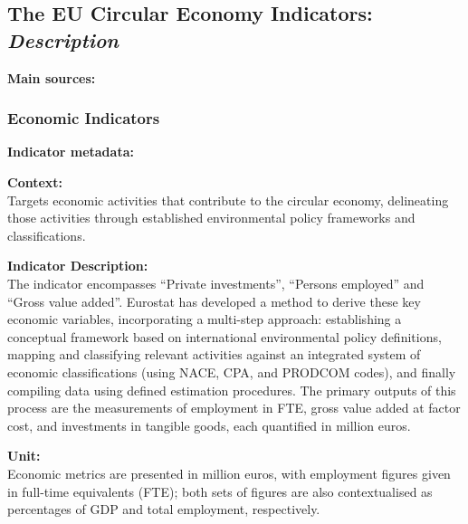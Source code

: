 
\subsection{The EU Circular Economy Indicators: \textit{Description}}

\textbf{Main sources:}~\cite{eu2018cemonitoring,eurostat2023data,eu2023cemonitoring}



\subsubsection{Economic Indicators}

\textbf{Indicator metadata:}   \href{https://ec.europa.eu/eurostat/cache/metadata/en/cei_cie011_esmsip2.htm}{\faExternalLink}

{\large\textbf{Context:}}  \\ \indent
Targets economic activities that contribute to the circular economy, delineating those activities through established environmental policy frameworks and classifications.

{\large\textbf{Indicator Description:}}  \\ \indent
The indicator encompasses ``Private investments'', ``Persons employed'' and ``Gross value added''. Eurostat has developed a method to derive these key economic variables, incorporating a multi-step approach: establishing a conceptual framework based on international environmental policy definitions, mapping and classifying relevant activities against an integrated system of economic classifications (using NACE, CPA, and PRODCOM codes), and finally compiling data using defined estimation procedures. The primary outputs of this process are the measurements of employment in FTE, gross value added at factor cost, and investments in tangible goods, each quantified in million euros.

{\large\textbf{Unit:}}  \\ \indent
Economic metrics are presented in million euros, with employment figures given in full-time equivalents (FTE); both sets of figures are also contextualised as percentages of GDP and total employment, respectively.

